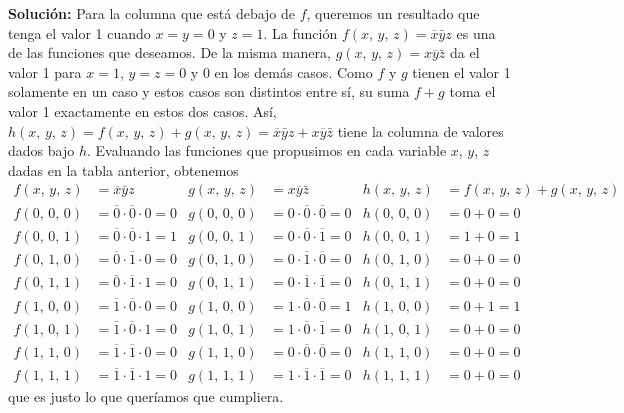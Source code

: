 \begin{myexample}
    \tcblower
    \textbf{\color{jblueleft}Solución:} Para la columna que está debajo de $f$, queremos un resultado que tenga el valor 1 cuando $x = y = 0$ y $z = 1$. La función $f(x, \, y, \, z) = \overline{x} \bar{y} z$ es una de las funciones que deseamos. De la misma manera, $g(x, \, y, \, z) = x \overline{y} \bar{z}$ da el valor 1 para $x = 1$, $y = z = 0$ y 0 en los demás casos. Como $f$ y $g$ tienen el valor 1 solamente en un caso y estos casos son distintos entre sí, su suma $f + g$ toma el valor 1 exactamente en estos dos casos. Así, $h(x, \, y, \, z) = f(x, \, y, \, z) + g(x, \, y, \, z) = \overline{x} \bar{y} z + x \overline{y} \bar{z}$ tiene la columna de valores dados bajo $h$. Evaluando las funciones que propusimos en cada variable $x$, $y$, $z$ dadas en la tabla anterior, obtenemos
    \begin{align*}
        f(x, \, y, \, z) & = \overline{x} \bar{y} z & g(x, \, y, \, z) & = x \overline{y} \bar{z} & h(x, \, y, \, z) & = f(x, \, y, \, z) + g(x, \, y, \, z) \\
        f(0, \, 0, \, 0) & = \overline{0} \cdot \overline{0} \cdot 0 = 0 & g(0, \, 0, \, 0) & = 0 \cdot \overline{0} \cdot \overline{0} = 0 & h(0, \, 0, \, 0) & = 0 + 0 = 0 \\
        f(0, \, 0, \, 1) & = \overline{0} \cdot \overline{0} \cdot 1 = 1 & g(0, \, 0, \, 1) & = 0 \cdot \overline{0} \cdot \overline{1} = 0 & h(0, \, 0, \, 1) & = 1 + 0 = 1 \\
        f(0, \, 1, \, 0) & = \overline{0} \cdot \overline{1} \cdot 0 = 0 & g(0, \, 1, \, 0) & = 0 \cdot \overline{1} \cdot \overline{0} = 0 & h(0, \, 1, \, 0) & = 0 + 0 = 0 \\
        f(0, \, 1, \, 1) & = \overline{0} \cdot \overline{1} \cdot 1 = 0 & g(0, \, 1, \, 1) & = 0 \cdot \overline{1} \cdot \overline{1} = 0 & h(0, \, 1, \, 1) & = 0 + 0 = 0 \\
        f(1, \, 0, \, 0) & = \overline{1} \cdot \overline{0} \cdot 0 = 0 & g(1, \, 0, \, 0) & = 1 \cdot \overline{0} \cdot \overline{0} = 1 & h(1, \, 0, \, 0) & = 0 + 1 = 1 \\
        f(1, \, 0, \, 1) & = \overline{1} \cdot \overline{0} \cdot 1 = 0 & g(1, \, 0, \, 1) & = 1 \cdot \overline{0} \cdot \overline{1} = 0 & h(1, \, 0, \, 1) & = 0 + 0 = 0 \\
        f(1, \, 1, \, 0) & = \overline{1} \cdot \overline{1} \cdot 0 = 0 & g(1, \, 1, \, 0) & = 0 \cdot \overline{0} \cdot \overline{0} = 0 & h(1, \, 1, \, 0) & = 0 + 0 = 0 \\
        f(1, \, 1, \, 1) & = \overline{1} \cdot \overline{1} \cdot 1 = 0 & g(1, \, 1, \, 1) & = 1 \cdot \overline{1} \cdot \overline{1} = 0 & h(1, \, 1, \, 1) & = 0 + 0 = 0
    \end{align*}
    que es justo lo que queríamos que cumpliera.
\end{myexample}

